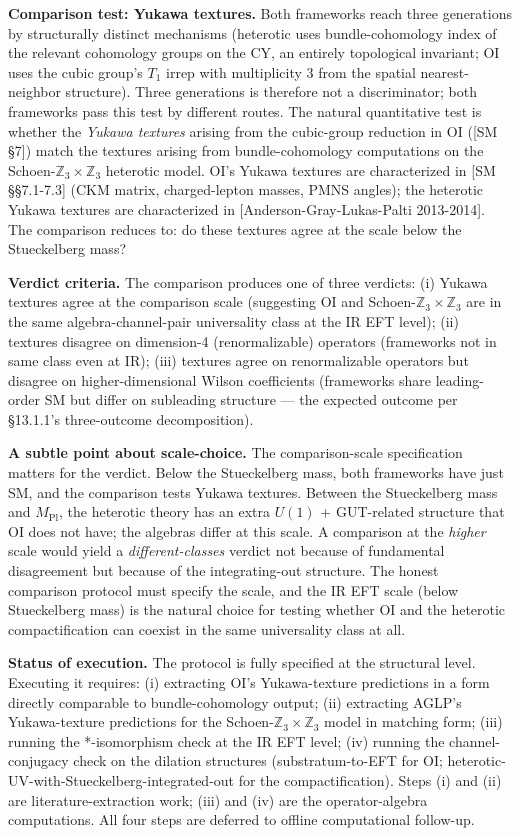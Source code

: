 \documentclass[
]{article}
\begin{document}
\textbf{Comparison test: Yukawa textures.} Both frameworks reach three
generations by structurally distinct mechanisms (heterotic uses
bundle-cohomology index of the relevant cohomology groups on the CY, an
entirely topological invariant; OI uses the cubic group's \(T_1\) irrep
with multiplicity 3 from the spatial nearest-neighbor structure). Three
generations is therefore not a discriminator; both frameworks pass this
test by different routes. The natural quantitative test is whether the
\emph{Yukawa textures} arising from the cubic-group reduction in OI
({[}SM §7{]}) match the textures arising from bundle-cohomology
computations on the Schoen-\(\mathbb{Z}_3 \times \mathbb{Z}_3\)
heterotic model. OI's Yukawa textures are characterized in {[}SM
§§7.1-7.3{]} (CKM matrix, charged-lepton masses, PMNS angles); the
heterotic Yukawa textures are characterized in
{[}Anderson-Gray-Lukas-Palti 2013-2014{]}. The comparison reduces to: do
these textures agree at the scale below the Stueckelberg mass?

\textbf{Verdict criteria.} The comparison produces one of three
verdicts: (i) Yukawa textures agree at the comparison scale (suggesting
OI and Schoen-\(\mathbb{Z}_3 \times \mathbb{Z}_3\) are in the same
algebra-channel-pair universality class at the IR EFT level); (ii)
textures disagree on dimension-4 (renormalizable) operators (frameworks
not in same class even at IR); (iii) textures agree on renormalizable
operators but disagree on higher-dimensional Wilson coefficients
(frameworks share leading-order SM but differ on subleading structure
--- the expected outcome per §13.1.1's three-outcome decomposition).

\textbf{A subtle point about scale-choice.} The comparison-scale
specification matters for the verdict. Below the Stueckelberg mass, both
frameworks have just SM, and the comparison tests Yukawa textures.
Between the Stueckelberg mass and \(M_{\mathrm{Pl}}\), the heterotic
theory has an extra \(U(1)\) + GUT-related structure that OI does not
have; the algebras differ at this scale. A comparison at the
\emph{higher} scale would yield a \emph{different-classes} verdict not
because of fundamental disagreement but because of the integrating-out
structure. The honest comparison protocol must specify the scale, and
the IR EFT scale (below Stueckelberg mass) is the natural choice for
testing whether OI and the heterotic compactification can coexist in the
same universality class at all.

\textbf{Status of execution.} The protocol is fully specified at the
structural level. Executing it requires: (i) extracting OI's
Yukawa-texture predictions in a form directly comparable to
bundle-cohomology output; (ii) extracting AGLP's Yukawa-texture
predictions for the Schoen-\(\mathbb{Z}_3 \times \mathbb{Z}_3\) model in
matching form; (iii) running the *-isomorphism check at the IR EFT
level; (iv) running the channel-conjugacy check on the dilation
structures (substratum-to-EFT for OI;
heterotic-UV-with-Stueckelberg-integrated-out for the compactification).
Steps (i) and (ii) are literature-extraction work; (iii) and (iv) are
the operator-algebra computations. All four steps are deferred to
offline computational follow-up.
\end{document}

